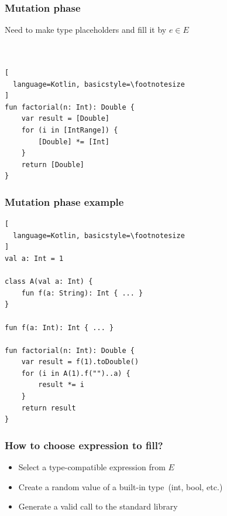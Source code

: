 
\begin{frame}[fragile]
	\frametitle{Mutation phase}
	Need to make type placeholders and fill it by $e \in E$
	\\ \ \\ \ 
\begin{lstlisting}[
  language=Kotlin, basicstyle=\footnotesize
]
fun factorial(n: Int): Double {
    var result = [Double]
    for (i in [IntRange]) {
        [Double] *= [Int]
    }
    return [Double]
}
\end{lstlisting}
\end{frame}


\begin{frame}[fragile]
	\frametitle{Mutation phase example}
\begin{lstlisting}[
  language=Kotlin, basicstyle=\footnotesize
]
val a: Int = 1

class A(val a: Int) {
    fun f(a: String): Int { ... }
}

fun f(a: Int): Int { ... }

fun factorial(n: Int): Double {
    var result = f(1).toDouble()
    for (i in A(1).f("")..a) {
        result *= i
    }
    return result
}
\end{lstlisting}
\end{frame}


\begin{frame}[fragile]
	\frametitle{How to choose expression to fill?}
	\begin{itemize}
		\item Select a type-compatible expression from $E$
		\item Create a random value of a built-in type~(int, bool, etc.)
		\item Generate a valid call to the standard library
	\end{itemize}
\end{frame}

